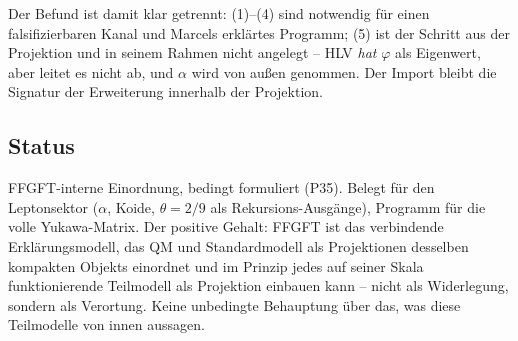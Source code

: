 Der Befund ist damit klar getrennt: (1)--(4) sind notwendig für einen
falsifizierbaren Kanal und Marcels erklärtes Programm; (5) ist der Schritt aus
der Projektion und in seinem Rahmen nicht angelegt -- HLV \emph{hat}
$\varphi$ als Eigenwert, aber leitet es nicht ab, und $\alpha$ wird von außen
genommen. Der Import bleibt die Signatur der Erweiterung innerhalb der
Projektion.

\subsection*{Status}

FFGFT-interne Einordnung, bedingt formuliert (P35). Belegt für den
Leptonsektor ($\alpha$, Koide, $\theta = 2/9$ als Rekursions-Ausgänge),
Programm für die volle Yukawa-Matrix. Der positive Gehalt: FFGFT ist das
verbindende Erklärungsmodell, das QM und Standardmodell als Projektionen
desselben kompakten Objekts einordnet und im Prinzip jedes auf seiner Skala
funktionierende Teilmodell als Projektion einbauen kann -- nicht als
Widerlegung, sondern als Verortung. Keine unbedingte Behauptung über das,
was diese Teilmodelle von innen aussagen.

